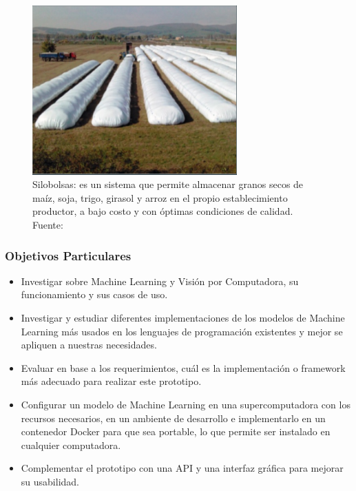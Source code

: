     \begin{figure}
        \centering
        \includegraphics[width=0.7\textwidth]{img/silobolsa.png}
        \caption{Silobolsas: es un sistema que permite almacenar granos secos de maíz, soja, trigo, girasol y arroz en el propio establecimiento productor, a bajo costo y con óptimas condiciones de calidad. Fuente: \cite{img_silo}}
        \label{fig:silobolsa}
    \end{figure}

\subsubsection{Objetivos Particulares}
\begin{itemize}
    \item Investigar sobre Machine Learning y Visión por Computadora, su funcionamiento y sus casos de uso.
    \item Investigar y estudiar diferentes implementaciones de los modelos de Machine Learning más usados en los lenguajes de programación existentes y mejor se apliquen a nuestras necesidades.
    \item Evaluar en base a los requerimientos, cuál es la implementación o framework más adecuado para realizar este prototipo.
    \item Configurar un modelo de Machine Learning en una supercomputadora con los recursos necesarios, en un ambiente de desarrollo e implementarlo en un contenedor Docker \cite{docker} para que sea portable, lo que permite ser instalado en cualquier computadora.
    \item Complementar el prototipo con una API \cite{api} y una interfaz gráfica para mejorar su usabilidad.
\end{itemize}

